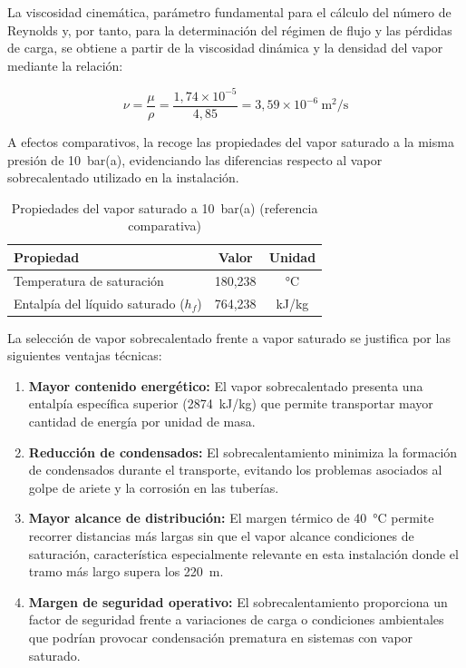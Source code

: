 La viscosidad cinemática, parámetro fundamental para el cálculo del número de Reynolds y, por tanto, para la determinación del régimen de flujo y las pérdidas de carga, se obtiene a partir de la viscosidad dinámica y la densidad del vapor mediante la relación:

\begin{equation}
	\nu = \frac{\mu}{\rho} = \frac{1{,}74 \times 10^{-5}}{4{,}85} = 3{,}59 \times 10^{-6} \ \text{m}^2\text{/s}
	\label{eq:viscosidad-cinematica}
\end{equation}

A efectos comparativos, la  recoge las propiedades del vapor saturado a la misma presión de 10~bar(a), evidenciando las diferencias respecto al vapor sobrecalentado utilizado en la instalación.

\begin{table}[H]
	\centering
	\caption{Propiedades del vapor saturado a 10~bar(a) (referencia comparativa)}
	\label{tab:comparacion-vapor-saturado}
	\begin{tabular}{lcc}
		\toprule
		\textbf{Propiedad}                    & \textbf{Valor} & \textbf{Unidad} \\
		\midrule
		Temperatura de saturación             & 180,238        & °C              \\
		Entalpía del líquido saturado ($h_f$) & 764,238        & kJ/kg           \\
		\bottomrule
	\end{tabular}
\end{table}

La selección de vapor sobrecalentado frente a vapor saturado se justifica por las siguientes ventajas técnicas:

\begin{enumerate}[label=\arabic*., leftmargin=2em]
	\item \textbf{Mayor contenido energético:} El vapor sobrecalentado presenta una entalpía específica superior (2874~kJ/kg) que permite transportar mayor cantidad de energía por unidad de masa.
	\item \textbf{Reducción de condensados:} El sobrecalentamiento minimiza la formación de condensados durante el transporte, evitando los problemas asociados al golpe de ariete y la corrosión en las tuberías.
	\item \textbf{Mayor alcance de distribución:} El margen térmico de 40~°C permite recorrer distancias más largas sin que el vapor alcance condiciones de saturación, característica especialmente relevante en esta instalación donde el tramo más largo supera los 220~m.
	\item \textbf{Margen de seguridad operativo:} El sobrecalentamiento proporciona un factor de seguridad frente a variaciones de carga o condiciones ambientales que podrían provocar condensación prematura en sistemas con vapor saturado.
\end{enumerate}

